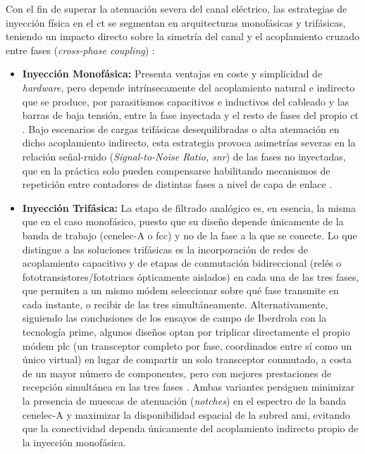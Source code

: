 Con el fin de superar la atenuación severa del canal eléctrico, las estrategias de inyección física en el \gls{ct} se segmentan en arquitecturas monofásicas y trifásicas, teniendo un impacto directo sobre la simetría del canal y el acoplamiento cruzado entre fases (\textit{cross-phase coupling}) \cite{5764420}:
\begin{itemize}
    \item \textbf{Inyección Monofásica:} Presenta ventajas en coste y simplicidad de \textit{hardware}, pero depende intrínsecamente del acoplamiento natural e indirecto que se produce, por parasitismos capacitivos e inductivos del cableado y las barras de baja tensión, entre la fase inyectada y el resto de fases del propio \gls{ct} \cite{5764420}. Bajo escenarios de cargas trifásicas desequilibradas o alta atenuación en dicho acoplamiento indirecto, esta estrategia provoca asimetrías severas en la relación señal-ruido (\textit{Signal-to-Noise Ratio, \gls{snr}}) de las fases no inyectadas, que en la práctica solo pueden compensarse habilitando mecanismos de repetición entre contadores de distintas fases a nivel de capa de enlace \cite{5764420}.
    \item \textbf{Inyección Trifásica:} La etapa de filtrado analógico es, en esencia, la misma que en el caso monofásico, puesto que su diseño depende únicamente de la banda de trabajo (\gls{cenelec}-A o \gls{fcc}) y no de la fase a la que se conecte. Lo que distingue a las soluciones trifásicas es la incorporación de redes de acoplamiento capacitivo y de etapas de conmutación bidireccional (relés o fototransistores/fototriacs ópticamente aislados) en cada una de las tres fases, que permiten a un mismo módem seleccionar sobre qué fase transmite en cada instante, o recibir de las tres simultáneamente. Alternativamente, siguiendo las conclusiones de los ensayos de campo de Iberdrola con la tecnología \gls{prime}, algunos diseños optan por triplicar directamente el propio módem \gls{plc} (un transceptor completo por fase, coordinados entre sí como un único  virtual) en lugar de compartir un solo transceptor conmutado, a costa de un mayor número de componentes, pero con mejores prestaciones de recepción simultánea en las tres fases \cite{5764420}. Ambas variantes persiguen minimizar la presencia de muescas de atenuación (\textit{notches}) en el espectro de la banda \gls{cenelec}-A y maximizar la disponibilidad espacial de la subred \gls{ami}, evitando que la conectividad dependa únicamente del acoplamiento indirecto propio de la inyección monofásica.
\end{itemize}

